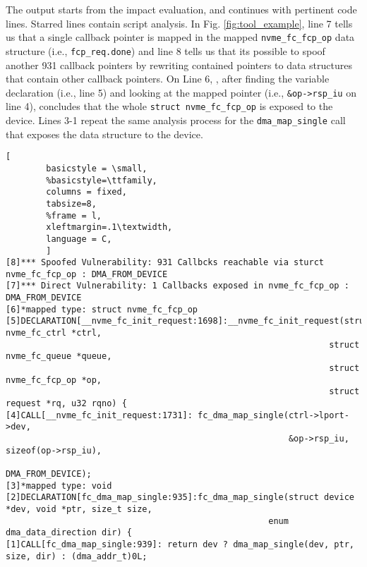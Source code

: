 The output starts from the impact evaluation, and continues with pertinent code lines. Starred lines contain script analysis. In Fig. \ref{fig:tool_example}, line 7 tells us that a single callback pointer is mapped in the mapped \texttt{nvme\_fc\_fcp\_op} data structure (i.e., \texttt{fcp\_req.done}) and line 8 tells us that its possible to spoof another 931 callback pointers by rewriting contained pointers to data structures that contain other callback pointers. On Line 6, \tool, after finding the variable declaration (i.e., line 5) and looking at the mapped pointer (i.e., \texttt{\&op->rsp\_iu} on line 4), concludes that the whole \texttt{struct nvme\_fc\_fcp\_op} is exposed to the device. Lines 3-1 repeat the same analysis process for the \texttt{dma\_map\_single} call that exposes the data structure to the device. 

\begin{figure*}[t]

        \begin{lstlisting}[
        basicstyle = \small,
        %basicstyle=\ttfamily,
        columns = fixed,
        tabsize=8,
        %frame = l,
        xleftmargin=.1\textwidth,
        language = C,
        ]
[8]*** Spoofed Vulnerability: 931 Callbcks reachable via sturct nvme_fc_fcp_op : DMA_FROM_DEVICE
[7]*** Direct Vulnerability: 1 Callbacks exposed in nvme_fc_fcp_op : DMA_FROM_DEVICE
[6]*mapped type: struct nvme_fc_fcp_op
[5]DECLARATION[__nvme_fc_init_request:1698]:__nvme_fc_init_request(struct nvme_fc_ctrl *ctrl,
                                                                struct nvme_fc_queue *queue, 
                                                                struct nvme_fc_fcp_op *op, 
                                                                struct request *rq, u32 rqno) {
[4]CALL[__nvme_fc_init_request:1731]: fc_dma_map_single(ctrl->lport->dev,
                                                        &op->rsp_iu, sizeof(op->rsp_iu),
                                                        DMA_FROM_DEVICE);
[3]*mapped type: void
[2]DECLARATION[fc_dma_map_single:935]:fc_dma_map_single(struct device *dev, void *ptr, size_t size, 
                                                    enum dma_data_direction dir) {
[1]CALL[fc_dma_map_single:939]: return dev ? dma_map_single(dev, ptr, size, dir) : (dma_addr_t)0L;

                \end{lstlisting}
        \caption{ Tool output example.}
        \label{fig:tool_example}

\end{figure*}
